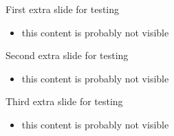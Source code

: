 \documentclass[xcolor=table,12pt]{beamer}
\begin{document}
\begin{frame}{First extra slide for testing}
  \begin{itemize}
  \item this content is probably not visible
  \end{itemize}
\end{frame}

\begin{frame}{Second extra slide for testing}
  \begin{itemize}
  \item this content is probably not visible
  \end{itemize}
\end{frame}

\begin{frame}{Third extra slide for testing}
  \begin{itemize}
  \item this content is probably not visible
  \end{itemize}
\end{frame}
\end{document}
